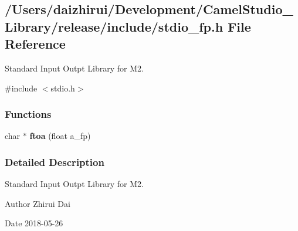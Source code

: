 \hypertarget{a00029}{}\subsection{/\+Users/daizhirui/\+Development/\+Camel\+Studio\+\_\+\+Library/release/include/stdio\+\_\+fp.h File Reference}
\label{a00029}


Standard Input Outpt Library for M2.  


{\ttfamily \#include $<$stdio.\+h$>$}\newline
\subsubsection*{Functions}
\begin{DoxyCompactItemize}
\item 
\mbox{\label{a00029_ad84834e66c9593acc3052b51d8fd783e}} 
char $\ast$ {\bfseries ftoa} (float a\+\_\+fp)
\end{DoxyCompactItemize}


\subsubsection{Detailed Description}
Standard Input Outpt Library for M2. 

\begin{DoxyAuthor}{Author}
Zhirui Dai 
\end{DoxyAuthor}
\begin{DoxyDate}{Date}
2018-\/05-\/26 
\end{DoxyDate}

